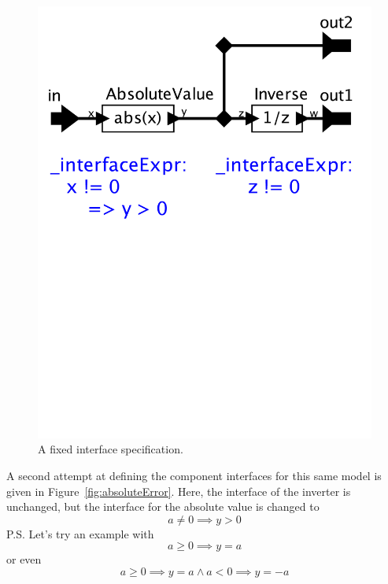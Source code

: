 \documentclass[preprint,11pt]{sigplanconf}
\begin{document}
\begin{figure}[htbp]
\centering
\includegraphics[width=\columnwidth]{figs/absoluteCorrected}
\caption{A fixed interface specification.}
\label{fig:absoluteCorrected}
\end{figure}

A second attempt at defining the component interfaces for this same model is
given in Figure~\ref{fig:absoluteError}.
Here, the interface of the inverter is unchanged,
but the interface for the absolute value is changed to
\[
a \ne 0 \implies y > 0
\]
P.S. Let's try an example with \[ a \ge 0 \implies y = a\] or even \[a \ge 0
\implies y = a  \wedge a < 0 \implies y = -a\]
\end{document}
